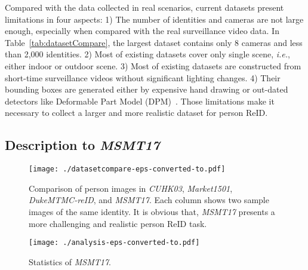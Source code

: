 \documentclass[10pt,twocolumn,letterpaper]{article}
\begin{document}
Compared with the data collected in real scenarios, current datasets present limitations in four aspects: 1) The number of identities and cameras are not large enough, especially when compared with the real surveillance video data. In Table~\ref{tab:datasetCompare}, the largest dataset contains only 8 cameras and less than 2,000 identities. 2) Most of existing datasets cover only single scene, \emph{i.e.}, either indoor or outdoor scene. 3) Most of existing datasets are constructed from short-time surveillance videos without significant lighting changes. 4) Their bounding boxes are generated either by expensive hand drawing or out-dated detectors like Deformable Part Model (DPM)~\cite{felzenszwalb2010object}. Those limitations make it necessary to collect a larger and more realistic dataset for person ReID.

\subsection{Description to \textbf{\emph{MSMT17}}}
\label{sec:description}

\begin{figure}[ht!]
    \begin{center}
    \texttt{[image: ./datasetcompare-eps-converted-to.pdf]}
    \end{center}
    \caption{Comparison of person images in \emph{CUHK03}, \emph{Market1501}, \emph{DukeMTMC-reID}, and \emph{MSMT17}. Each column shows two sample images of the same identity. It is obvious that, \emph{MSMT17} presents a more challenging and realistic person ReID task.}
    \label{fig:datasetcompare}
\end{figure}



\begin{figure*}[ht!]
    \begin{center}
    \texttt{[image: ./analysis-eps-converted-to.pdf]}
    \end{center}
    \vspace{-3mm}
    \caption{Statistics of \emph{MSMT17}. }
    \label{fig:statistics}
\end{figure*}
\end{document}
